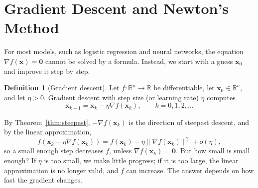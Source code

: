 \documentclass[11pt]{article}
\newcommand{\norm}[1]{\lVert #1 \rVert}
\theoremstyle{definition}
\newtheorem{definition}{Definition}[section]
\theoremstyle{plain}
\theoremstyle{remark}
\begin{document}
\section{Gradient Descent and Newton's Method}\label{sec:gd}

For most models, such as logistic regression and neural networks, the equation $\nabla f(\mathbf{x}) = \mathbf{0}$ cannot be solved by a formula. Instead, we start with a guess $\mathbf{x}_0$ and improve it step by step.

\begin{definition}[Gradient descent]\label{def:gd}
    Let $f: \mathbb{R}^n \to \mathbb{R}$ be differentiable, let $\mathbf{x}_0 \in \mathbb{R}^n$, and let $\eta > 0$. Gradient descent with step size (or learning rate) $\eta$ computes
    \[\mathbf{x}_{k+1} = \mathbf{x}_k - \eta \nabla f(\mathbf{x}_k), \qquad k = 0, 1, 2, \ldots\]
\end{definition}

By Theorem~\ref{thm:steepest}, $-\nabla f(\mathbf{x}_k)$ is the direction of steepest descent, and by the linear approximation,
\[f(\mathbf{x}_k - \eta\nabla f(\mathbf{x}_k)) = f(\mathbf{x}_k) - \eta\norm{\nabla f(\mathbf{x}_k)}^2 + o(\eta),\]
so a small enough step decreases $f$, unless $\nabla f(\mathbf{x}_k) = \mathbf{0}$. But how small is small enough? If $\eta$ is too small, we make little progress; if it is too large, the linear approximation is no longer valid, and $f$ can increase. The answer depends on how fast the gradient changes.
\end{document}
